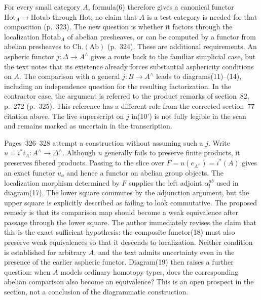 For every small category $A$, formula(6) therefore gives a canonical functor $\mathrm{Hot}_A\to\mathrm{Hotab}$ through $\mathrm{Hot}$; no claim that $A$ is a test category is needed for that composition (p.~323). The new question is whether it factors through the localization $\mathrm{Hotab}_A$ of abelian presheaves, or can be computed by a functor from abelian presheaves to $\mathrm{Ch.}(\mathrm{Ab})$ (p.~324). These are additional requirements. An aspheric functor $j:\Delta\to A^{\wedge}$ gives a route back to the familiar simplicial case, but the text notes that its existence already forces substantial asphericity conditions on $A$. The comparison with a general $j:B\to A^{\wedge}$ leads to diagrams(11)--(14), including an independence question for the resulting factorization. In the contractor case, the argument is referred to the product remarks of section~82, p.~272 (p.~325). This reference has a different role from the corrected section~77 citation above. The live superscript on $j$ in(10') is not fully legible in the scan and remains marked as uncertain in the transcription.

Pages~326--328 attempt a construction without assuming such a $j$. Write $u=i^*i_A:A^{\wedge}\to\Delta^{\wedge}$. Although $u$ generally fails to preserve finite products, it preserves fibered products. Passing to the slice over $F=u(e_{A^{\wedge}})=i^*(A)$ gives an exact functor $u_o$ and hence a functor on abelian group objects. The localization morphism determined by $F$ supplies the left adjoint $\alpha^{ab}_!$ used in diagram(17). The lower square commutes by the adjunction argument, but the upper square is explicitly described as failing to look commutative. The proposed remedy is that its comparison map should become a weak equivalence after passage through the lower square. The author immediately revises the claim that this is the exact sufficient hypothesis: the composite functor(18) must also preserve weak equivalences so that it descends to localization. Neither condition is established for arbitrary $A$, and the text admits uncertainty even in the presence of the earlier aspheric functor. Diagram(19) then raises a further question: when $A$ models ordinary homotopy types, does the corresponding abelian comparison also become an equivalence? This is an open prospect in the section, not a conclusion of the diagrammatic construction.

